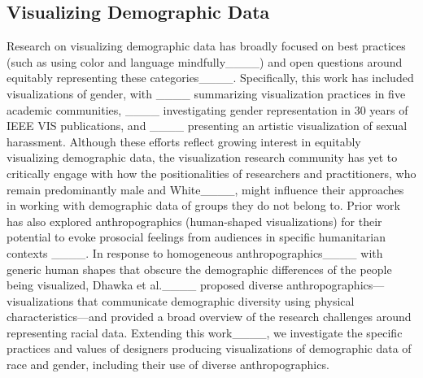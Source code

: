\subsection{Visualizing Demographic Data}
Research on visualizing demographic data has broadly focused on best practices (such as using color and language mindfully____) and open questions around equitably representing these categories____. Specifically, this work has included visualizations of gender, with ____ summarizing visualization practices in five academic communities, ____ investigating gender representation in 30 years of IEEE VIS publications, and ____ presenting an artistic visualization of sexual harassment. Although these efforts reflect growing interest in equitably visualizing demographic data, the visualization research community has yet to critically engage with how the positionalities of researchers and practitioners, who remain predominantly male and White____, might influence their approaches in working with demographic data of groups they do not belong to. Prior work has also explored anthropographics (human-shaped visualizations) for their potential to evoke prosocial feelings from audiences in specific humanitarian contexts ____. In response to homogeneous anthropographics____ with generic human shapes that obscure the demographic differences of the people being visualized, Dhawka et al.____ proposed diverse anthropographics---visualizations that communicate demographic diversity using physical characteristics---and provided a broad overview of the research challenges around representing racial data. Extending this work____, we investigate the specific practices and values of designers producing visualizations of demographic data of race and gender, including their use of diverse anthropographics. 

